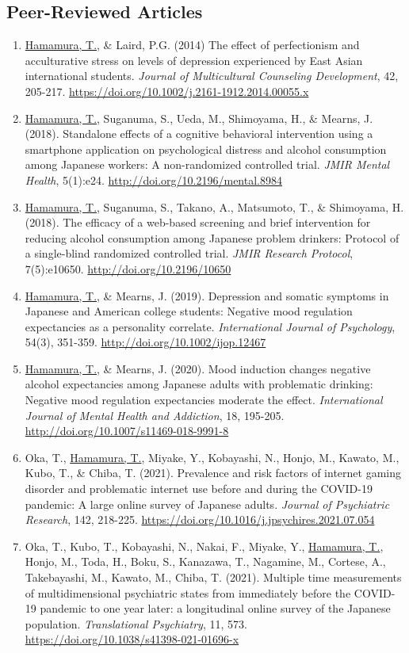\documentclass[a4paper]{article}
\begin{document}
\subsection{Peer-Reviewed Articles}
\begin{enumerate}
	\item \underline{Hamamura, T.}, \& Laird, P.G. (2014) The effect of perfectionism and acculturative stress on levels of depression experienced by East Asian international students. \textit{Journal of Multicultural Counseling Development}, 42, 205-217. \url{https://doi.org/10.1002/j.2161-1912.2014.00055.x}
	\item \underline{Hamamura, T.}, Suganuma, S., Ueda, M., Shimoyama, H., \& Mearns, J. (2018). Standalone effects of a cognitive behavioral intervention using a smartphone application on psychological distress and alcohol consumption among Japanese workers: A non-randomized controlled trial. \textit{JMIR Mental Health}, 5(1):e24. \url{http://doi.org/10.2196/mental.8984}
	\item \underline{Hamamura, T.}, Suganuma, S., Takano, A., Matsumoto, T., \& Shimoyama, H. (2018). The efficacy of a web-based screening and brief intervention for reducing alcohol consumption among Japanese problem drinkers: Protocol of a single-blind randomized controlled trial. \textit{JMIR Research Protocol}, 7(5):e10650.  \url{http://doi.org/10.2196/10650}
	\item \underline{Hamamura, T.}, \& Mearns, J. (2019). Depression and somatic symptoms in Japanese and American college students: Negative mood regulation expectancies as a personality correlate. \textit{International Journal of Psychology}, 54(3), 351-359. \url{http://doi.org/10.1002/ijop.12467}
	\item \underline{Hamamura, T.}, \& Mearns, J. (2020). Mood induction changes negative alcohol expectancies among Japanese adults with problematic drinking: Negative mood regulation expectancies moderate the effect. \textit{International Journal of Mental Health and Addiction}, 18, 195-205. \url{http://doi.org/10.1007/s11469-018-9991-8}
	\item Oka, T., \underline{Hamamura, T.}, Miyake, Y.,  Kobayashi, N., Honjo, M., Kawato, M., Kubo, T., \& Chiba, T. (2021). Prevalence and risk factors of internet gaming disorder and problematic internet use before and during the COVID-19 pandemic: A large online survey of Japanese adults. \textit{Journal of Psychiatric Research}, 142, 218-225. \url{https://doi.org/10.1016/j.jpsychires.2021.07.054}
	\item Oka, T., Kubo, T., Kobayashi, N., Nakai, F., Miyake, Y., \underline{Hamamura, T.}, Honjo, M., Toda, H., Boku, S., Kanazawa, T., Nagamine, M.,  Cortese, A., Takebayashi, M., Kawato, M., Chiba, T. (2021). Multiple time measurements of multidimensional psychiatric states from immediately before the COVID-19 pandemic to one year later: a longitudinal online survey of the Japanese population. \textit{Translational Psychiatry}, 11, 573. \url{https://doi.org/10.1038/s41398-021-01696-x}

\end{enumerate}
\end{document}
